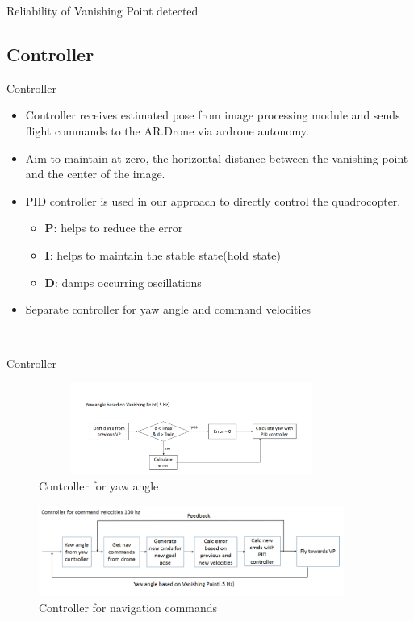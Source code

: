 \documentclass[8pt]{beamer}
\begin{document}
{{\begin{frame}{Reliability of Vanishing Point detected}
\end{frame}

\subsection{Controller}
\begin{frame}{Controller}
\begin{itemize}
\setlength\itemsep{1em}
 \item Controller receives estimated pose from image processing module and sends flight commands to the AR.Drone via ardrone autonomy.
 \item Aim to maintain at zero, the horizontal distance between the vanishing point and the center of the image. 
 \item PID controller is used in our approach to directly control the quadrocopter.
 \begin{itemize}
  \item \textbf{P}: helps to reduce the error
  \item \textbf{I}: helps to maintain the stable state(hold state)
  \item \textbf{D}: damps occurring oscillations
 \end{itemize}
\item Separate controller for yaw angle and command velocities
\end{itemize}\\[5pt]

\end{frame}

\begin{frame}{Controller}
 \begin{figure}
\includegraphics[width=10cm, height=3cm]{images/Yaw_controller.png}%
\caption{Controller for yaw angle}%
\end{figure}
\vspace{0.3cm}
\begin{figure}
\includegraphics[width=10cm, height=3cm]{images/cmd_controller.png}%
\caption{Controller for navigation commands}%
\end{figure}
\end{frame}

}}
\end{document}
